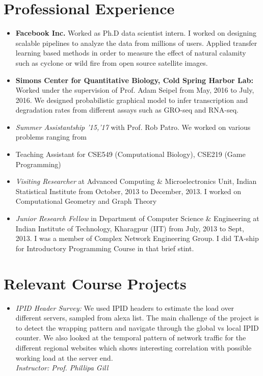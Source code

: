 \documentclass{res}
\begin{document}
\begin{resume}
\section{Professional Experience}
\begin{itemize}
\item {\textbf {Facebook Inc.}} Worked as Ph.D data scientist intern. I worked on designing scalable pipelines to analyze the data from millions of users. Applied transfer learning based methods in order to measure the effect of natural calamity such as cyclone or wild fire from open source satellite images.   

\item {\textbf {Simons Center for Quantitative Biology, Cold Spring Harbor Lab:}} Worked under the supervision of Prof. Adam Seipel from May, 2016 to July, 2016. We designed probabilistic graphical model to infer transcription and degradation rates from different assays such as GRO-seq and RNA-seq.  

\item {\it Summer Assistantship '15,'17} with Prof. Rob Patro. We worked on various problems ranging from 
\item  Teaching Assistant for CSE549 (Computational Biology), CSE219 (Game Programming)
\item {\it Visiting Researcher} at Advanced Computing \& Microelectronics Unit, Indian Statistical Institute from October, 2013 to December, 
2013. I worked on Computational Geometry and Graph Theory
\item {\it Junior Research Fellow} in Department of Computer Science \& Engineering at Indian Institute of Technology, Kharagpur (IIT) 
from July, 2013 to Sept, 2013. I was a member of Complex Network Engineering Group. I did TA-ship for Introductory Programming 
Course in that brief stint. 
\end{itemize}

\section{Relevant Course Projects}
\begin{itemize}

 \item{ \it{IPID Header Survey:}} We used IPID headers to estimate the load over different servers, sampled from alexa
 list. The main challenge of the project is to detect the wrapping pattern and navigate through the global vs local IPID counter. 
 We also looked at the temporal pattern of network traffic for the different regional websites which shows interesting correlation with possible 
 working load at the server end. \\
 {\it Instructor: Prof. Phillipa Gill}
 

\end{itemize}
\end{resume}
\end{document}
